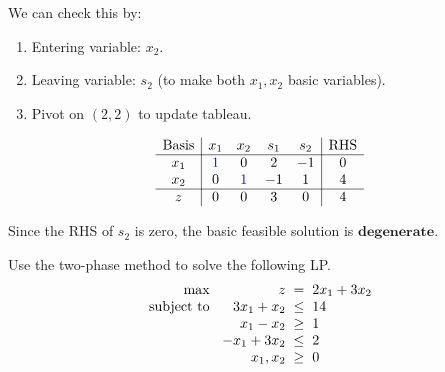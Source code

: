 \documentclass[a4paper, 10pt]{article}
\begin{document}
\begin{solution}
\vspace{2mm}

We can check this by:
\begin{enumerate}
    \item Entering variable: \( x_2 \).
    \item Leaving variable: \( s_2 \) (to make both \( x_1,  x_2 \) basic variables).
    \item Pivot on \( (2,2) \) to update tableau.
\end{enumerate}
\[
\begin{array}{c|cccc|c}
    \text{Basis} & x_1 & x_2 & s_1 & s_2 & \text{RHS} \\
    \hline
    x_1 & \textcolor[HTML]{0000FF}{1} & 0 & 2 & -1 & 0 \\
    x_2 & 0 & \textcolor[HTML]{0000FF}{1} & -1 & 1 & 4 \\
    \hline
    z & 0 & 0 & 3 & 0 & 4 \\
\end{array}
\]

Since the RHS of \( s_2 \) is zero, the basic feasible solution is \( \boxed{\textbf{degenerate}} \).
\end{solution}


\begin{problem}
Use the two-phase method to solve the following LP.
\[
\begin{array}{@{\hspace{2mm}} r @{\hspace{2mm}} r @{\hspace{2mm}} c @{\hspace{2mm}} l}
    \text{max } & z & = & 2x_1 + 3x_2 \\
    \text{subject to } & 3x_1 + x_2 & \leq & 14 \\
    & x_1 - x_2 & \geq & 1 \\
    & -x_1 + 3x_2 & \leq & 2 \\
    & x_1, x_2 & \geq & 0
\end{array}
\]
\end{problem}
\end{document}
